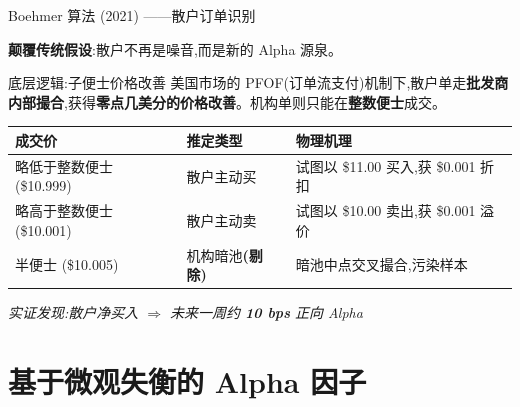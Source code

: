 \documentclass[10pt,aspectratio=169]{beamer}
\begin{document}
\begin{frame}{Boehmer 算法 (2021) ——散户订单识别}

  \textbf{颠覆传统假设}:散户不再是噪音,而是新的 Alpha 源泉。

  \vfill

  \begin{block}{底层逻辑:子便士价格改善}
    美国市场的 PFOF(订单流支付)机制下,散户单走\textbf{批发商内部撮合},获得\textbf{零点几美分的价格改善}。机构单则只能在\textbf{整数便士}成交。
  \end{block}

  \vfill

  \small
  \begin{tabular}{p{3.6cm}|p{2.6cm}|p{6cm}}
    \toprule
    \textbf{成交价} & \textbf{推定类型} & \textbf{物理机理} \\
    \midrule
    略低于整数便士 (\$10.999) & 散户主动买 & 试图以 \$11.00 买入,获 \$0.001 折扣 \\
    略高于整数便士 (\$10.001) & 散户主动卖 & 试图以 \$10.00 卖出,获 \$0.001 溢价 \\
    半便士 (\$10.005) & 机构暗池\textbf{(剔除)} & 暗池中点交叉撮合,污染样本 \\
    \bottomrule
  \end{tabular}

  \vfill

  \centering\small\emph{实证发现:散户净买入 $\Rightarrow$ 未来一周约 \textbf{10 bps} 正向 Alpha}
\end{frame}

\section{基于微观失衡的 Alpha 因子}
\end{document}
